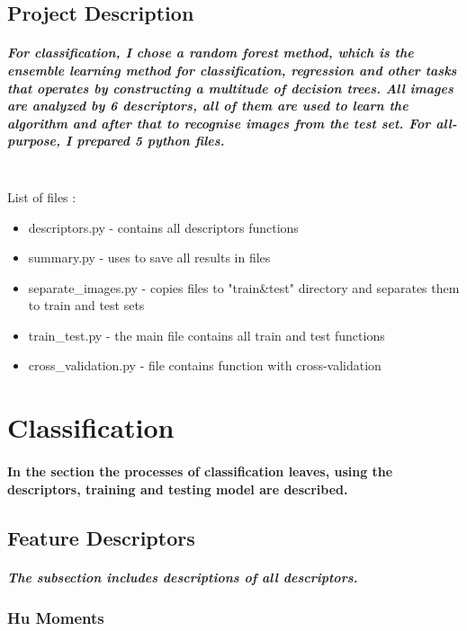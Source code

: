 \documentclass[12pt]{article}
\begin{document}
\subsection{Project Description}

\subparagraph{
For classification, I chose a random forest method, which is the ensemble learning method for classification, regression and other tasks that operates by constructing a multitude of decision trees. All images are analyzed by 6 descriptors, all of them are used to learn the algorithm and after that to recognise images from the test set. For all-purpose, I prepared 5 python files.\\\\
}

List of files :
\begin{itemize}
\item descriptors.py - contains all descriptors functions
\item summary.py - uses to save all results in files
\item separate\_images.py - copies files to "train\&test" directory and separates them to train and test sets
\item train\_test.py - the main file contains all train and test functions
\item cross\_validation.py - file contains function with cross-validation
\end{itemize}

\newpage

\section{Classification}

\paragraph{
In the section the processes of classification leaves, using the descriptors, training and testing model are described.
}

\subsection{Feature Descriptors}

\subparagraph{
The subsection includes descriptions of all descriptors.
}

\subsubsection{Hu Moments}
\end{document}
